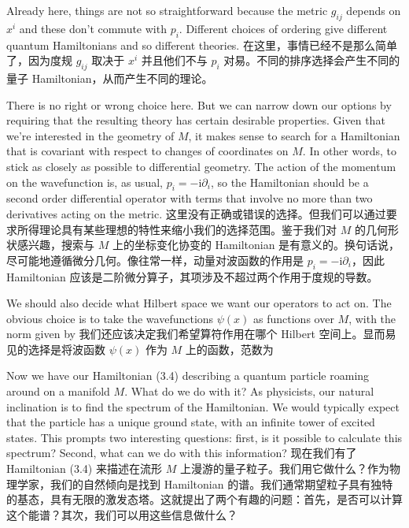 \documentclass{ctexart}
\newcommand{\rmi}{\mathrm{i}}
\begin{document}
\begin{paracol}{2}
Already here, things are not so straightforward because the metric $g_{ij}$ depends on $x^i$ and these don’t commute with $p_i$. Different choices of ordering give different quantum Hamiltonians and so different theories.
\switchcolumn
在这里，事情已经不是那么简单了，因为度规 $g_{ij}$ 取决于 $x^i$ 并且他们不与 $p_i$ 对易。不同的排序选择会产生不同的量子 Hamiltonian，从而产生不同的理论。
\switchcolumn*

There is no right or wrong choice here. But we can narrow down our options by requiring that the resulting theory has certain desirable properties. Given that we’re interested in the geometry of $M$, it makes sense to search for a Hamiltonian that is covariant with respect to changes of coordinates on $M$. In other words, to stick as closely as possible to differential geometry. The action of the momentum on the wavefunction is, as usual, $p_i = - \rmi \partial_i$, so the Hamiltonian should be a second order differential operator with terms that involve no more than two derivatives acting on the metric.
\switchcolumn
这里没有正确或错误的选择。但我们可以通过要求所得理论具有某些理想的特性来缩小我们的选择范围。鉴于我们对 $M$ 的几何形状感兴趣，搜索与 $M$ 上的坐标变化协变的 Hamiltonian 是有意义的。换句话说，尽可能地遵循微分几何。像往常一样，动量对波函数的作用是 $p_i = - \rmi \partial_i$，因此 Hamiltonian 应该是二阶微分算子，其项涉及不超过两个作用于度规的导数。
\switchcolumn*

We should also decide what Hilbert space we want our operators to act on. The obvious choice is to take the wavefunctions $\psi(x)$ as functions over $M$, with the norm given by
\switchcolumn
我们还应该决定我们希望算符作用在哪个 Hilbert 空间上。显而易见的选择是将波函数 $\psi(x)$ 作为 $M$ 上的函数，范数为
\switchcolumn*

Now we have our Hamiltonian (3.4) describing a quantum particle roaming around on a manifold $M$. What do we do with it? As physicists, our natural inclination is to find the spectrum of the Hamiltonian. We would typically expect that the particle has a unique ground state, with an infinite tower of excited states. This prompts two interesting questions: first, is it possible to calculate this spectrum? Second, what can we do with this information?
\switchcolumn
现在我们有了 Hamiltonian (3.4) 来描述在流形 $M$ 上漫游的量子粒子。我们用它做什么？作为物理学家，我们的自然倾向是找到 Hamiltonian 的谱。我们通常期望粒子具有独特的基态，具有无限的激发态塔。这就提出了两个有趣的问题：首先，是否可以计算这个能谱？其次，我们可以用这些信息做什么？
\switchcolumn*


\end{paracol}
\end{document}
